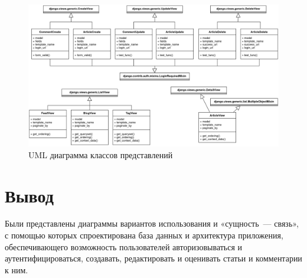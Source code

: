 \begin{figure}[H]
	\centering
	\includegraphics[width=\linewidth]{inc/img/uml-views}
	\caption{UML диаграмма классов представлений}
	\label{img:uml-views}
\end{figure}

\section*{Вывод}

Были представлены диаграммы вариантов использования и «сущность~— связь», с помощью которых спроектирована база данных и архитектура приложения, обеспечивающего возможность пользователей авторизовываться и аутентифицироваться, создавать, редактировать и оценивать статьи и комментарии к ним.
